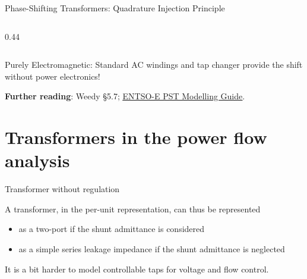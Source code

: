 \begin{frame}{Phase-Shifting Transformers: Quadrature Injection Principle}
\begin{columns}[T]
\begin{column}{0.44\textwidth}
\end{column}
\end{columns}
    \alert{Purely Electromagnetic}: Standard AC windings and tap changer provide the shift without power electronics!
    
    \vspace{0.08cm}
    {\tiny \textbf{Further reading}: Weedy \S 5.7; \href{https://eepublicdownloads.blob.core.windows.net/public-cdn-container/clean-documents/CIM_documents/Grid_Model_CIM/ENTSOE_CGMES_v2.4.14_28May2014_PSTmodelling.pdf}{\underline{ENTSO-E PST Modelling Guide}}.}

\end{frame}

\section{Transformers in the power flow analysis}

\begin{frame}{Transformer without regulation}


A transformer, in the per-unit representation, can thus be represented 
\begin{itemize}
    \item as a two-port if the shunt admittance is considered
    \item as a simple series leakage impedance if the shunt admittance is neglected
\end{itemize}
 
It is a bit harder to model controllable taps for voltage and flow control.

\end{frame}

